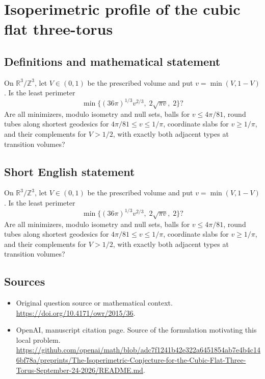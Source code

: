 \documentclass[11pt]{article}
\begin{document}
\section*{Isoperimetric profile of the cubic flat three-torus}\label{30007140}
\subsection{Definitions and mathematical statement}
On $\mathbb R^3/\mathbb Z^3$, let $V\in(0,1)$ be the prescribed volume and put $v=\min(V,1-V)$. Is the least perimeter
\[\min\bigl\{(36\pi)^{1/3}v^{2/3},\;2\sqrt{\pi v},\;2\bigr\}?\]
Are all minimizers, modulo isometry and null sets, balls for $v\leq4\pi/81$, round tubes along shortest geodesics for $4\pi/81\leq v\leq1/\pi$, coordinate slabs for $v\geq1/\pi$, and their complements for $V>1/2$, with exactly both adjacent types at transition volumes?
\subsection{Short English statement}
On $\mathbb R^3/\mathbb Z^3$, let $V\in(0,1)$ be the prescribed volume and put $v=\min(V,1-V)$. Is the least perimeter
\[\min\bigl\{(36\pi)^{1/3}v^{2/3},\;2\sqrt{\pi v},\;2\bigr\}?\]
Are all minimizers, modulo isometry and null sets, balls for $v\leq4\pi/81$, round tubes along shortest geodesics for $4\pi/81\leq v\leq1/\pi$, coordinate slabs for $v\geq1/\pi$, and their complements for $V>1/2$, with exactly both adjacent types at transition volumes?
\subsection{Sources}
\begin{itemize}
\item[S1] Original question source or mathematical context.
\url{https://doi.org/10.4171/owr/2015/36}.
\item[S2] OpenAI, manuscript citation page. Source of the formulation motivating this local problem.
\url{https://github.com/openai/math/blob/adc7f1241b42e322a6451854ab7e4b4c146bf78a/preprints/The-Isoperimetric-Conjecture-for-the-Cubic-Flat-Three-Torus-September-24-2026/README.md}.
\end{itemize}
\end{document}
